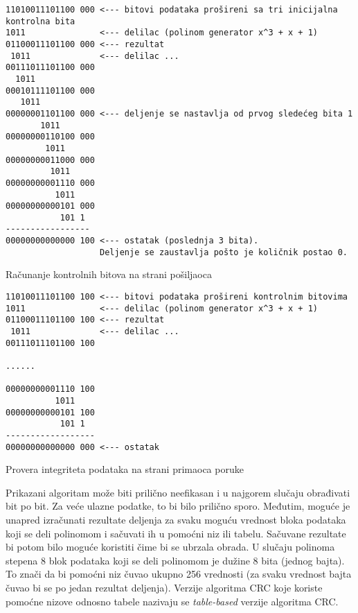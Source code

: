 \documentclass[12pt,oneside]{memoir}
\begin{document}

\begin{listing}[!ht]
\begin{verbatim}
11010011101100 000 <--- bitovi podataka prošireni sa tri inicijalna kontrolna bita
1011               <--- delilac (polinom generator x^3 + x + 1)
01100011101100 000 <--- rezultat
 1011              <--- delilac ...
00111011101100 000
  1011
00010111101100 000
   1011
00000001101100 000 <--- deljenje se nastavlja od prvog sledećeg bita 1
       1011             
00000000110100 000
        1011
00000000011000 000
         1011
00000000001110 000
          1011
00000000000101 000
           101 1
-----------------
00000000000000 100 <--- ostatak (poslednja 3 bita). 
                   Deljenje se zaustavlja pošto je količnik postao 0. 
\end{verbatim}
\caption{Računanje kontrolnih bitova na strani pošiljaoca}
\label{posiljalac_poruke}
\end{listing}

\begin{listing}[!ht]
\begin{verbatim}
11010011101100 100 <--- bitovi podataka prošireni kontrolnim bitovima
1011               <--- delilac (polinom generator x^3 + x + 1)
01100011101100 100 <--- rezultat
 1011              <--- delilac ...
00111011101100 100

......

00000000001110 100
          1011
00000000000101 100
           101 1
------------------
00000000000000 000 <--- ostatak
\end{verbatim}
\caption{Provera integriteta podataka na strani primaoca poruke}
\label{primalac_poruke}
\end{listing}

Prikazani algoritam može biti prilično neefikasan i u najgorem slučaju obrađivati bit 
po bit. Za veće ulazne podatke, to bi bilo prilično sporo. Međutim, moguće je unapred 
izračunati rezultate deljenja za svaku moguću vrednost bloka podataka koji se deli 
polinomom i sačuvati ih u pomoćni niz ili tabelu. Sačuvane rezultate bi potom bilo 
moguće koristiti čime bi se ubrzala obrada. U slučaju polinoma stepena 8 blok podataka 
koji se deli polinomom je dužine 8 bita (jednog bajta). To znači da bi pomoćni niz 
čuvao ukupno 256 vrednosti (za svaku vrednost bajta čuvao bi se po jedan rezultat 
deljenja). Verzije algoritma CRC koje koriste pomoćne nizove odnosno tabele nazivaju 
se \textit{table-based} verzije algoritma CRC.
\end{document}
